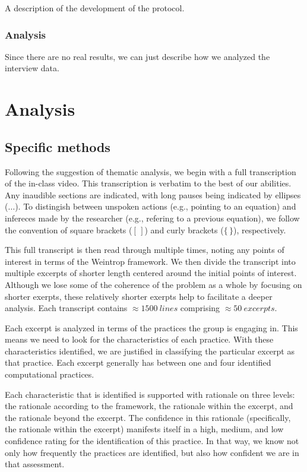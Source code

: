 \documentclass{msuphddissertation}
\begin{document}
\begin{doublespace}
A description of the development of the protocol.

\subsection{Analysis}

Since there are no real results, we can just describe how we analyzed the interview data.

%
%

\chapter{Analysis}\label{CH5:Analysis}

\section{Specific methods}

Following the suggestion of thematic analysis, we begin with a full transcription of the in-class video.  This transcription is verbatim to the best of our abilities.  Any inaudible sections are indicated, with long pauses being indicated by ellipses ($\ldots$).  To distingish between unspoken actions (e.g., pointing to an equation) and infereces made by the researcher (e.g., refering to a previous equation), we follow the convention of square brackets ($[\,]$) and curly brackets ($\{\,\}$), respectively.

This full transcript is then read through multiple times, noting any points of interest in terms of the Weintrop framework.  We then divide the transcript into multiple excerpts of shorter length centered around the initial points of interest.  Although we lose some of the coherence of the problem as a whole by focusing on shorter exerpts, these relatively shorter exerpts help to facilitate a deeper analysis.  Each transcript contains $\approx\SI{1500}{lines}$ comprising $\approx\SI{50}{excerpts}$.

Each excerpt is analyzed in terms of the practices the group is engaging in.  This means we need to look for the characteristics of each practice. With these characteristics identified, we are justified in classifying the particular excerpt as that practice.  Each excerpt generally has between one and four identified computational practices. 

Each characteristic that is identified is supported with rationale on three levels: the rationale according to the framework, the rationale within the excerpt, and the rationale beyond the excerpt.  The confidence in this rationale (specifically, the rationale within the excerpt) manifests itself in a high, medium, and low confidence rating for the identification of this practice.  In that way, we know not only how frequently the practices are identified, but also how confident we are in that assessment.


\end{doublespace}
\end{document}
